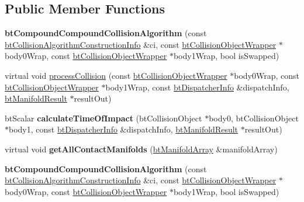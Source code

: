 \subsection*{Public Member Functions}
\begin{DoxyCompactItemize}
\item 
\mbox{\label{classbtCompoundCompoundCollisionAlgorithm_a9e1acc0d58db97d05fc44f0a5591a2e5}} 
{\bfseries bt\+Compound\+Compound\+Collision\+Algorithm} (const \hyperlink{structbtCollisionAlgorithmConstructionInfo}{bt\+Collision\+Algorithm\+Construction\+Info} \&ci, const \hyperlink{structbtCollisionObjectWrapper}{bt\+Collision\+Object\+Wrapper} $\ast$body0\+Wrap, const \hyperlink{structbtCollisionObjectWrapper}{bt\+Collision\+Object\+Wrapper} $\ast$body1\+Wrap, bool is\+Swapped)
\item 
virtual void \hyperlink{classbtCompoundCompoundCollisionAlgorithm_a5fb9d60f9713c0e3795c89390353beb3}{process\+Collision} (const \hyperlink{structbtCollisionObjectWrapper}{bt\+Collision\+Object\+Wrapper} $\ast$body0\+Wrap, const \hyperlink{structbtCollisionObjectWrapper}{bt\+Collision\+Object\+Wrapper} $\ast$body1\+Wrap, const \hyperlink{structbtDispatcherInfo}{bt\+Dispatcher\+Info} \&dispatch\+Info, \hyperlink{classbtManifoldResult}{bt\+Manifold\+Result} $\ast$result\+Out)
\item 
\mbox{\label{classbtCompoundCompoundCollisionAlgorithm_a6341a601d82d44850bea7b45f22ff971}} 
bt\+Scalar {\bfseries calculate\+Time\+Of\+Impact} (bt\+Collision\+Object $\ast$body0, bt\+Collision\+Object $\ast$body1, const \hyperlink{structbtDispatcherInfo}{bt\+Dispatcher\+Info} \&dispatch\+Info, \hyperlink{classbtManifoldResult}{bt\+Manifold\+Result} $\ast$result\+Out)
\item 
\mbox{\label{classbtCompoundCompoundCollisionAlgorithm_af9cb74c252d4fd42b7d44738154ba501}} 
virtual void {\bfseries get\+All\+Contact\+Manifolds} (\hyperlink{classbtAlignedObjectArray}{bt\+Manifold\+Array} \&manifold\+Array)
\item 
\mbox{\label{classbtCompoundCompoundCollisionAlgorithm_a9e1acc0d58db97d05fc44f0a5591a2e5}} 
{\bfseries bt\+Compound\+Compound\+Collision\+Algorithm} (const \hyperlink{structbtCollisionAlgorithmConstructionInfo}{bt\+Collision\+Algorithm\+Construction\+Info} \&ci, const \hyperlink{structbtCollisionObjectWrapper}{bt\+Collision\+Object\+Wrapper} $\ast$body0\+Wrap, const \hyperlink{structbtCollisionObjectWrapper}{bt\+Collision\+Object\+Wrapper} $\ast$body1\+Wrap, bool is\+Swapped)

\end{DoxyCompactItemize}
